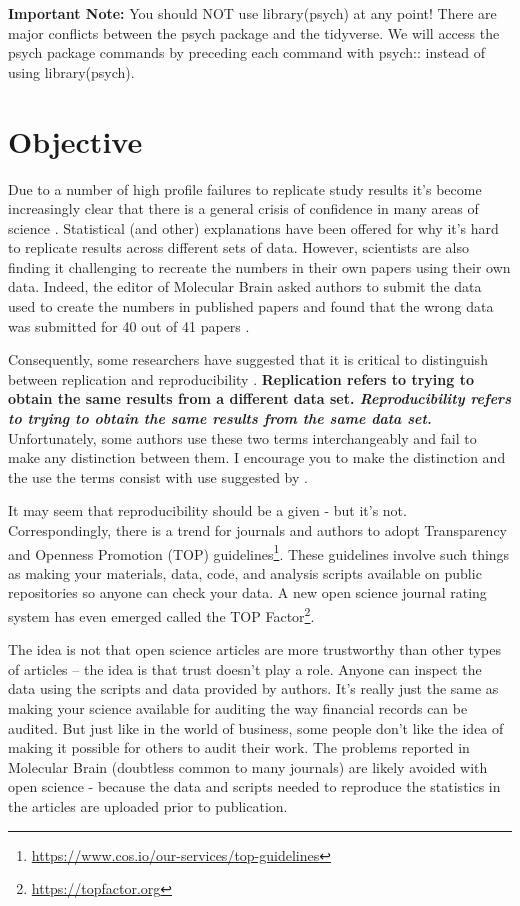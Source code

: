 \documentclass[
]{krantz}
\renewcommand{\href}[2]{#2\footnote{\url{#1}}}
\begin{document}
\textbf{Important Note:} You should NOT use library(psych) at any point! There are major conflicts between the psych package and the tidyverse. We will access the psych package commands by preceding each command with psych:: instead of using library(psych).

\hypertarget{objective-1}{%
\section{Objective}\label{objective-1}}

Due to a number of high profile failures to replicate study results \citep{cos2015} it's become increasingly clear that there is a general crisis of confidence in many areas of science \citep{baker2016}. Statistical (and other) explanations have been offered \citep{simmons2011} for why it's hard to replicate results across different sets of data. However, scientists are also finding it challenging to recreate the numbers in their own papers using their own data. Indeed, the editor of Molecular Brain asked authors to submit the data used to create the numbers in published papers and found that the wrong data was submitted for 40 out of 41 papers \citep{miyakawa2020}.

Consequently, some researchers have suggested that it is critical to distinguish between replication and reproducibility \citep{patil2019}. \textbf{Replication refers to trying to obtain the same results from a different data set. \emph{Reproducibility refers to trying to obtain the same results from the same data set.} } Unfortunately, some authors use these two terms interchangeably and fail to make any distinction between them. I encourage you to make the distinction and the use the terms consist with use suggested by \citep{patil2019}.

It may seem that reproducibility should be a given - but it's not. Correspondingly, there is a trend for journals and authors to adopt Transparency and Openness Promotion (TOP) \href{https://www.cos.io/our-services/top-guidelines}{guidelines}. These guidelines involve such things as making your materials, data, code, and analysis scripts available on public repositories so anyone can check your data. A new open science journal rating system has even emerged called the \href{https://topfactor.org}{TOP Factor}.

The idea is not that open science articles are more trustworthy than other types of articles -- the idea is that trust doesn't play a role. Anyone can inspect the data using the scripts and data provided by authors. It's really just the same as making your science available for auditing the way financial records can be audited. But just like in the world of business, some people don't like the idea of making it possible for others to audit their work. The problems reported in Molecular Brain (doubtless common to many journals) are likely avoided with open science - because the data and scripts needed to reproduce the statistics in the articles are uploaded prior to publication.
\end{document}
